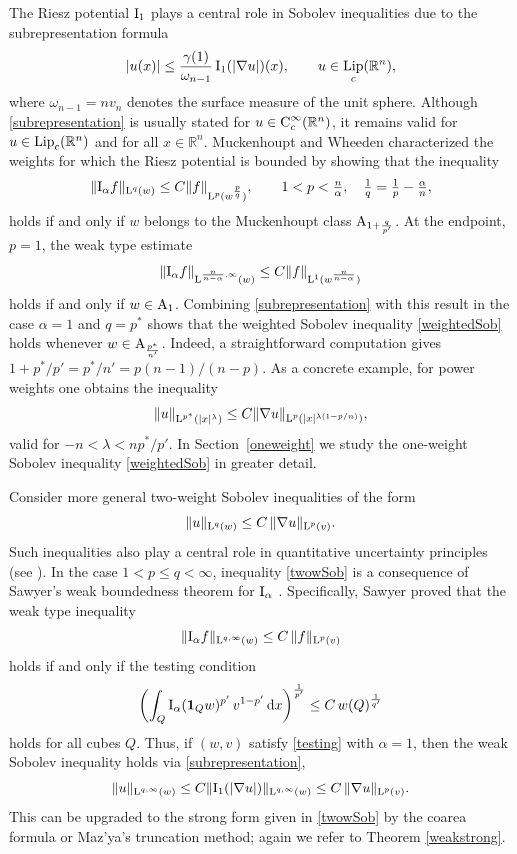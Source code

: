 \documentclass[11pt, a4paper, reqno]{amsart}
\newcommand{\R}{\mathbb R}
\newcommand{\A}{\textup A}
\newcommand{\al}{\alpha}
\newcommand{\Lup}{\textup{L}}
\newcommand{\Con}{\textup{C}}
\DeclareMathOperator{\Lip}{\textup{Lip}}
\theoremstyle{definition}
\theoremstyle{remark}
\begin{document}
The Riesz potential $\textup{I}_1$ plays a central role in Sobolev inequalities due to the subrepresentation formula
\begin{equation}\label{subrepresentation}
|u(x)| \le \frac{\gamma(1)}{\omega_{n-1}}\,\textup{I}_1(|\nabla u|)(x),
\qquad u \in \Lip_c(\R^n),
\end{equation}
where $\omega_{n-1} = n v_n$ denotes the surface measure of the unit sphere.  
Although \eqref{subrepresentation} is usually stated for $u \in \Con_c^\infty(\R^n)$, it remains valid for $u \in \Lip_c(\R^n)$ and for all $x \in \R^n$.  Muckenhoupt and Wheeden \cite{MW} characterized the weights for which the Riesz potential is bounded by showing that the inequality
\[
\|\textup{I}_\alpha f\|_{\Lup^q(w)} \le C \|f\|_{\Lup^p(w^{\frac{p}{q}})},
\qquad
{1< p}<\tfrac{n}{\alpha},
\quad
\tfrac1q=\tfrac1p-\tfrac{\alpha}{n},
\]
holds if and only if $w$ belongs to the Muckenhoupt class $\A_{1+\frac{q}{p'}}$.  At the endpoint, $p=1$,  the weak type estimate
$$\|\textup I_\al f\|_{\Lup^{\frac{n}{n-\al},\infty}(w)}\leq C\|f\|_{\Lup^1(w^{\frac{n}{n-\al}})}$$ holds
if and only if $w\in \A_1$. Combining \eqref{subrepresentation} with this result in the case $\alpha=1$ and $q=p^*$ shows that the weighted Sobolev inequality \eqref{weightedSob} holds whenever
$w\in \A_{\frac{p^*}{n'}}$. Indeed, a straightforward computation gives
$1+p^*/p' = p^*/n' = p(n-1)/(n-p)$.  As a concrete example, for power weights one obtains the inequality
\[
\|u\|_{\Lup^{p^*}(|x|^\lambda)} \le C \|\nabla u\|_{\Lup^p(|x|^{\lambda(1-p/n)})},
\]
valid for $-n<\lambda< n p^*/p'$. In Section~\ref{oneweight} we study the one-weight Sobolev inequality \eqref{weightedSob} in greater detail.

 
Consider more general two-weight Sobolev inequalities of the form
\begin{equation}\label{twowSob}
\|u\|_{\Lup^q(w)} \le C\,\|\nabla u\|_{\Lup^p(v)}.
\end{equation}
Such inequalities also play a central role in quantitative uncertainty principles {(see 
\cite{CW, Feff, CWW, LL, Per95}).}  In the case $1 < p \le q < \infty$, inequality \eqref{twowSob} is a consequence of Sawyer’s weak boundedness theorem for $\textup{I}_\al$ \cite{Saw84}. 
Specifically, Sawyer proved that the weak type inequality 
\[
\|\textup{I}_\al f\|_{\Lup^{q,\infty}(w)} \le C\,\|f\|_{\Lup^p(v)}
\]
%
holds if and only if the testing condition
\begin{equation}\label{testing}
\left(\int_Q \textup{I}_\al(\mathbf 1_Q w)^{p'}\, v^{1-p'}\,\mathrm dx\right)^{\frac{1}{p'}} \le C\,w(Q)^{\frac1{q'}}
\end{equation}
holds for all cubes $Q$. Thus, if $(w,v)$ satisfy \eqref{testing} with $\al=1$, then the weak Sobolev inequality holds via \eqref{subrepresentation},
\[
\|u\|_{\Lup^{q,\infty}(w)} \le C\|\textup{I}_1(|\nabla u|)\|_{\Lup^{q,\infty}(w)}\leq C\,\|\nabla u\|_{\Lup^p(v)}.
\]
This can be upgraded to the strong form given in \eqref{twowSob} by the coarea formula or Maz’ya’s truncation method; again we refer to Theorem \ref{weakstrong}.
\end{document}

